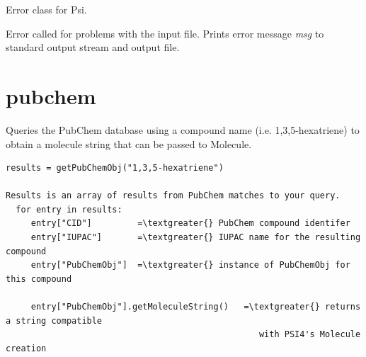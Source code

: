 \documentclass[letterpaper,10pt,english]{sphinxmanual}
\begin{document}
\begin{fulllineitems}
\label{index:psiexceptions.PsiException}
Error class for Psi.

\end{fulllineitems}


\begin{fulllineitems}
\label{index:psiexceptions.ValidationError}
Error called for problems with the input file. Prints
error message \emph{msg} to standard output stream and output file.

\end{fulllineitems}



\section{pubchem}
\label{index:pubchem}\label{index:module-pubchem}
Queries the PubChem database using a compound name (i.e. 1,3,5-hexatriene)
to obtain a molecule string that can be passed to Molecule.

\begin{Verbatim}[commandchars=\\\{\}]
results = getPubChemObj("1,3,5-hexatriene")

Results is an array of results from PubChem matches to your query.
  for entry in results:
     entry["CID"]         =\textgreater{} PubChem compound identifer
     entry["IUPAC"]       =\textgreater{} IUPAC name for the resulting compound
     entry["PubChemObj"]  =\textgreater{} instance of PubChemObj for this compound

     entry["PubChemObj"].getMoleculeString()   =\textgreater{} returns a string compatible
                                                  with PSI4's Molecule creation
\end{Verbatim}
\end{document}
